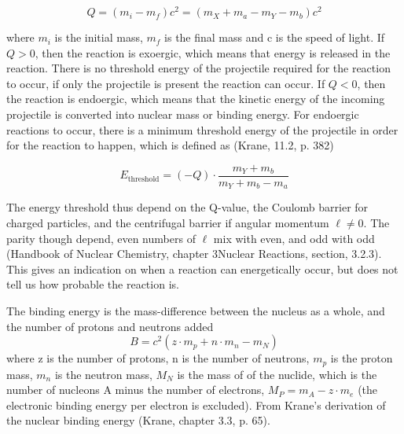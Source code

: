 \begin{equation} \label{eq:Q_value}
    Q = (m_i - m_f)c^2 = (m_X + m_a - m_Y - m_b)c^2
\end{equation}

\noindent where $m_i$ is the initial mass, $m_f$ is the final mass and c is the speed of light. If $Q>0$, then the reaction is exoergic, which means that energy is released in the reaction. There is no threshold energy of the projectile required for the reaction to occur, if only the projectile is present the reaction can occur. If $Q<0$, then the reaction is endoergic, which means that the kinetic energy of the incoming projectile is converted into nuclear mass or binding energy. For endoergic reactions to occur, there is a minimum threshold energy of the projectile in order for the reaction to happen, which is defined as (Krane, 11.2, p. 382)

\begin{equation} \label{eq:reaction_threshold}
    E_\text{threshold} = (-Q) \cdot \frac{m_Y +m_b}{m_Y + m_b -m_a}
\end{equation}


\noindent The energy threshold thus depend on the Q-value, the Coulomb barrier for charged particles, and the centrifugal barrier if angular momentum $\ell\neq 0$. The parity though depend, even numbers of $\ell$ mix with even, and odd with odd (Handbook of Nuclear Chemistry, chapter 3Nuclear Reactions, section, 3.2.3). This gives an indication on when a reaction can energetically occur, but does not tell us how probable the reaction is. %


The binding energy is the mass-difference between the nucleus as a whole, and the number of protons and neutrons added
\begin{equation} \label{eq:Binding_energy1}
    B = c^2(z\cdot m_p + n \cdot m_n - m_N)
\end{equation}
\noindent where z is the number of protons, n is the number of neutrons, $m_p$ is the proton mass, $m_n$ is the neutron mass, $M_N$ is the mass of of the nuclide, which is the number of nucleons A minus the number of electrons, $M_P = m_A - z\cdot m_e$ (the electronic binding energy per electron is excluded). From Krane's derivation of the nuclear binding energy (Krane, chapter 3.3, p. 65). 

